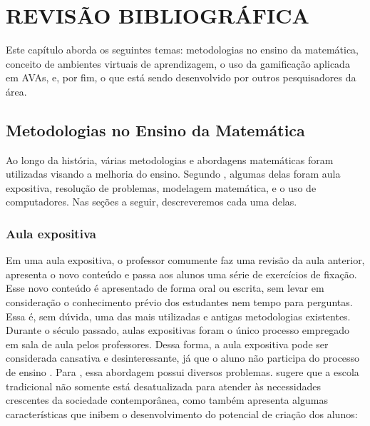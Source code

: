 \section{REVISÃO BIBLIOGRÁFICA}

Este capítulo aborda os seguintes temas: metodologias no ensino da matemática, conceito de ambientes virtuais de aprendizagem, o uso da gamificação aplicada em AVAs, e, por fim, o que está sendo 
desenvolvido por outros pesquisadores da área.

\subsection{Metodologias no Ensino da Matemática}

Ao longo da história, várias metodologias e abordagens matemáticas foram utilizadas visando a melhoria do ensino. Segundo , algumas delas foram aula expositiva, 
resolução de problemas, modelagem matemática, e o uso de computadores. Nas seções a seguir, descreveremos cada uma delas.

\subsubsection{Aula expositiva}

Em uma aula expositiva, o professor comumente faz uma revisão da aula anterior, apresenta o novo conteúdo e passa aos alunos uma série de exercícios de fixação. Esse novo conteúdo é apresentado de 
forma oral ou escrita, sem levar em consideração o conhecimento prévio dos estudantes nem tempo para perguntas. Essa é, sem dúvida, uma das mais utilizadas e antigas metodologias existentes. Durante 
o século passado, aulas expositivas foram o único processo empregado em sala de aula pelos professores. Dessa forma, a aula expositiva pode ser considerada cansativa e desinteressante, já que o aluno não participa do processo de ensino  \cite{hammes2003tendencias}. Para , essa abordagem possui diversos problemas.  sugere que a escola tradicional não somente está desatualizada para atender às necessidades 
crescentes da sociedade contemporânea, como também apresenta algumas características que inibem o desenvolvimento do potencial de criação dos alunos:

